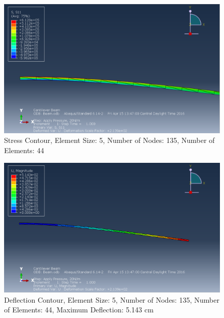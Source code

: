 \documentclass[a4paper]{article}
\begin{document}
\begin{figure}[ht]
\centering
\includegraphics[scale=.5]{6Nsize5Stress.PNG}
\caption{Stress Contour, Element Size: 5, Number of Nodes: 135, Number of Elements: 44}
\end{figure}
\begin{figure}[ht]
\centering
\includegraphics[scale=.5]{6Nsize5MDisplacement.PNG}
\caption{Deflection Contour, Element Size: 5, Number of Nodes: 135, Number of Elements: 44, Maximum Deflection: 5.143 cm}
\end{figure}
\end{document}
